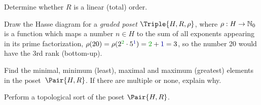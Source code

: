 \documentclass[a4paper,12pt]{article}
\begin{document}
\begin{tasks}
\begin{subtasks}
        \item Determine whether $R$ is a linear (total) order.

        \item Draw the Hasse diagram for a \textit{graded poset} $\Triple{H, R, \rho}$, where $\rho : H \to \mathbb{N}_{0}$ is a function which maps a number $n \in H$ to the sum of all exponents appearing in its prime factorization, \eg $\rho(20) = \rho(2^{\mathcolor{my-green}{2}} \cdot 5^{\textcolor{my-blue}{1}}) = \mathcolor{my-green}{2} + \textcolor{my-blue}{1} = 3$, so the number 20 would have the 3rd rank (bottom-up).

        \item Find the minimal, minimum (least), maximal and maximum (greatest) elements in the poset~$\Pair{H, R}$.
        If there are multiple or none, explain why.

        \item Perform a topological sort of the poset $\Pair{H, R}$.
    \end{subtasks}




\end{tasks}
\end{document}
